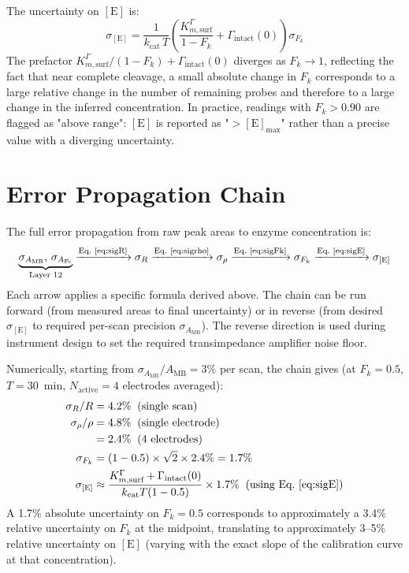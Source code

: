 \documentclass[10pt,a4paper]{article}
\numberwithin{equation}{section}
\newcommand{\AMB}{A_{\text{MB}}}
\newcommand{\AFc}{A_{\text{Fc}}}
\newcommand{\Gtot}{\Gamma_{\text{intact}}}
\newcommand{\kcat}{k_{\text{cat}}}
\newcommand{\Km}{K_{m,\text{surf}}^{\Gamma}}
\newcommand{\Fk}{F_k}
\begin{document}
The uncertainty on $[\text{E}]$ is:
\begin{equation}
  \sigma_{[\text{E}]} = \frac{1}{\kcat\,T}\left(
  \frac{\Km}{1-\Fk} + \Gtot(0)
  \right)\sigma_{\Fk}
  \label{eq:sigE}
\end{equation}
The prefactor $\Km/(1-\Fk) + \Gtot(0)$ diverges as $\Fk \to 1$, reflecting
the fact that near complete cleavage, a small absolute change in $\Fk$
corresponds to a large relative change in the number of remaining probes
and therefore to a large change in the inferred concentration. In practice,
readings with $\Fk > 0.90$ are flagged as "above range": $[\text{E}]$ is
reported as "$> [\text{E}]_\text{max}$" rather than a precise value with
a diverging uncertainty.

\section{Error Propagation Chain}
\label{sec:errprop}

The full error propagation from raw peak areas to enzyme concentration is:
\begin{equation}
  \underbrace{\sigma_{\AMB},\,\sigma_{\AFc}}_{\text{Layer~12}}
  \xrightarrow{\text{Eq.~\ref{eq:sigR}}}
  \sigma_R
  \xrightarrow{\text{Eq.~\ref{eq:sigrho}}}
  \sigma_\rho
  \xrightarrow{\text{Eq.~\ref{eq:sigFk}}}
  \sigma_{\Fk}
  \xrightarrow{\text{Eq.~\ref{eq:sigE}}}
  \sigma_{[\text{E}]}
  \label{eq:chain}
\end{equation}
Each arrow applies a specific formula derived above. The chain can be run
forward (from measured areas to final uncertainty) or in reverse (from
desired $\sigma_{[\text{E}]}$ to required per-scan precision $\sigma_{\AMB}$).
The reverse direction is used during instrument design to set the required
transimpedance amplifier noise floor.

Numerically, starting from $\sigma_{\AMB}/\AMB = 3\%$ per scan, the chain
gives (at $\Fk = 0.5$, $T = 30$~min, $N_\text{active} = 4$ electrodes averaged):
\begin{align*}
  \sigma_R/R &= 4.2\%\;\;(\text{single scan}) \\
  \sigma_\rho/\rho &= 4.8\%\;\;(\text{single electrode}) \\
  &= 2.4\%\;\;(\text{4 electrodes}) \\
  \sigma_{\Fk} &= (1-0.5) \times \sqrt{2} \times 2.4\% = 1.7\% \\
  \sigma_{[\text{E}]} &\approx \frac{\Km + \Gtot(0)}{\kcat T (1-0.5)}\times 1.7\%\;\;
  (\text{using Eq.~\ref{eq:sigE}})
\end{align*}
A 1.7\% absolute uncertainty on $\Fk = 0.5$ corresponds to approximately
a 3.4\% relative uncertainty on $\Fk$ at the midpoint, translating to
approximately 3--5\% relative uncertainty on $[\text{E}]$ (varying with the
exact slope of the calibration curve at that concentration).
\end{document}
